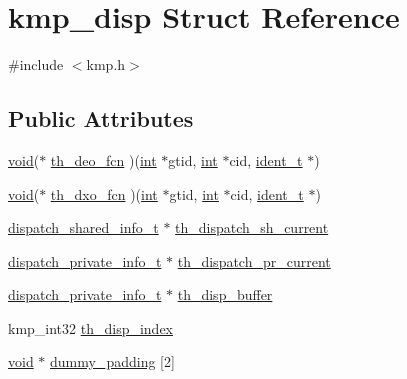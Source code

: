 \hypertarget{structkmp__disp}{\section{kmp\-\_\-disp Struct Reference}
\label{structkmp__disp}
}


{\ttfamily \#include $<$kmp.\-h$>$}

\subsection*{Public Attributes}
\begin{DoxyCompactItemize}
\item 
\hyperlink{ittnotify__static_8h_af941d56e55e3c5465135b60c4d6343ed}{void}($\ast$ \hyperlink{structkmp__disp_a34c2a4a67bbbb9a596e8cee765a12467}{th\-\_\-deo\-\_\-fcn} )(\hyperlink{ittnotify__static_8h_a8b8dcd723308a8cb5d84277c7a3fff70}{int} $\ast$gtid, \hyperlink{ittnotify__static_8h_a8b8dcd723308a8cb5d84277c7a3fff70}{int} $\ast$cid, \hyperlink{group__BASIC__TYPES_ga690fda6b92f039a72db263c6b4394ddb}{ident\-\_\-t} $\ast$)
\item 
\hyperlink{ittnotify__static_8h_af941d56e55e3c5465135b60c4d6343ed}{void}($\ast$ \hyperlink{structkmp__disp_a661b8f748ff2f3204218ae2d7ece3287}{th\-\_\-dxo\-\_\-fcn} )(\hyperlink{ittnotify__static_8h_a8b8dcd723308a8cb5d84277c7a3fff70}{int} $\ast$gtid, \hyperlink{ittnotify__static_8h_a8b8dcd723308a8cb5d84277c7a3fff70}{int} $\ast$cid, \hyperlink{group__BASIC__TYPES_ga690fda6b92f039a72db263c6b4394ddb}{ident\-\_\-t} $\ast$)
\item 
\hyperlink{kmp_8h_a77f9babc5a9999a105d305f27cf46d70}{dispatch\-\_\-shared\-\_\-info\-\_\-t} $\ast$ \hyperlink{structkmp__disp_afe430cfc39a695761004b645704b6b63}{th\-\_\-dispatch\-\_\-sh\-\_\-current}
\item 
\hyperlink{kmp_8h_a39b4260bfb46eb4f113a70e0a8ac26ea}{dispatch\-\_\-private\-\_\-info\-\_\-t} $\ast$ \hyperlink{structkmp__disp_a720af84b753cfa5961f42459754972b2}{th\-\_\-dispatch\-\_\-pr\-\_\-current}
\item 
\hyperlink{kmp_8h_a39b4260bfb46eb4f113a70e0a8ac26ea}{dispatch\-\_\-private\-\_\-info\-\_\-t} $\ast$ \hyperlink{structkmp__disp_ae9f9d6c19682600e62d7a9d8ab55fe75}{th\-\_\-disp\-\_\-buffer}
\item 
kmp\-\_\-int32 \hyperlink{structkmp__disp_a160f4b28144ce1cb64ccf0ceb9ad9ffc}{th\-\_\-disp\-\_\-index}
\item 
\hyperlink{ittnotify__static_8h_af941d56e55e3c5465135b60c4d6343ed}{void} $\ast$ \hyperlink{structkmp__disp_a2d0804dc17a8f9c75e24d504005595b0}{dummy\-\_\-padding} \mbox{[}2\mbox{]}
\end{DoxyCompactItemize}


